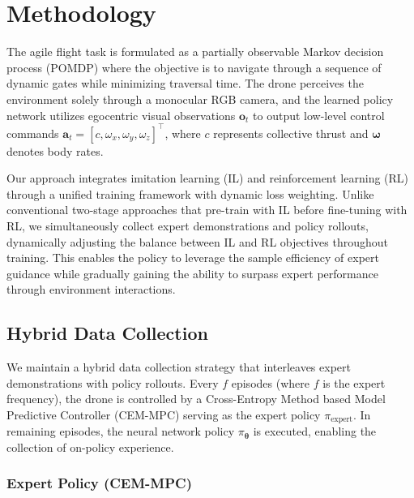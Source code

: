 \section{Methodology}
\label{sec:methodology}

The agile flight task is formulated as a partially observable Markov decision process (POMDP) where the objective is to navigate through a sequence of dynamic gates while minimizing traversal time. The drone perceives the environment solely through a monocular RGB camera, and the learned policy network utilizes egocentric visual observations $\mathbf{o}_t$ to output low-level control commands $\mathbf{a}_t = [c, \omega_x, \omega_y, \omega_z]^\top$, where $c$ represents collective thrust and $\boldsymbol{\omega}$ denotes body rates.

Our approach integrates imitation learning (IL) and reinforcement learning (RL) through a unified training framework with dynamic loss weighting. Unlike conventional two-stage approaches that pre-train with IL before fine-tuning with RL, we simultaneously collect expert demonstrations and policy rollouts, dynamically adjusting the balance between IL and RL objectives throughout training. This enables the policy to leverage the sample efficiency of expert guidance while gradually gaining the ability to surpass expert performance through environment interactions.

\subsection{Hybrid Data Collection}
\label{sec:data_collection}

We maintain a hybrid data collection strategy that interleaves expert demonstrations with policy rollouts. Every $f$ episodes (where $f$ is the expert frequency), the drone is controlled by a Cross-Entropy Method based Model Predictive Controller (CEM-MPC) serving as the expert policy $\pi_{\text{expert}}$. In remaining episodes, the neural network policy $\pi_{\boldsymbol{\theta}}$ is executed, enabling the collection of on-policy experience.

\subsubsection{Expert Policy (CEM-MPC)}

